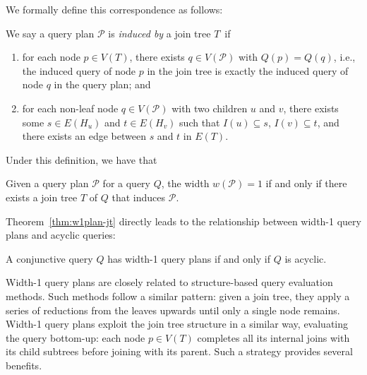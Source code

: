 We formally define this correspondence as follows:

\begin{definition} \label{def:w1plan-induced-by-jt}
    We say a query plan $\mathcal{P}$ is \emph{induced by} a join tree $T$~if
    \begin{enumerate}[leftmargin=*]
        \item for each node $p \in V(T)$, there exists $q \in V(\mathcal{P})$ with $Q(p) = Q(q)$,
        i.e., the induced query of node $p$ in the join tree is exactly the induced query of node $q$ in the query plan; and
        \item for each non-leaf node $q \in V(\mathcal{P})$ with two children $u$ and $v$, there exists some $s \in E(H_u)$ and $t \in E(H_v)$ such that $I(u) \subseteq s$, $I(v) \subseteq t$, and there exists an edge between $s$ and $t$ in $E(T)$.
    \end{enumerate}
\end{definition}

Under this definition, we have that

\begin{theorem} \label{thm:w1plan-jt}
    Given a query plan $\mathcal{P}$ for a query $Q$, the width $w(\mathcal{P}) = 1$ if and only if there exists a join tree $T$ of $Q$ that induces $\mathcal{P}$.
\end{theorem}

Theorem~\ref{thm:w1plan-jt} directly leads to the relationship between width-1 query plans and acyclic queries:

\begin{theorem}\label{thm:acyclicwidth}
    A conjunctive query $Q$ has width-1 query plans if and only if $Q$ is acyclic.
\end{theorem}


Width-1 query plans are closely related to structure-based query evaluation methods. Such methods follow a similar pattern: given a join tree, they apply a series of reductions from the leaves upwards until only a single node remains.  
Width-1 query plans exploit the join tree structure in a similar way, evaluating the query bottom-up: each node $p\in V(T)$ completes all its internal joins with its child subtrees before joining with its parent. Such a strategy provides several benefits.


